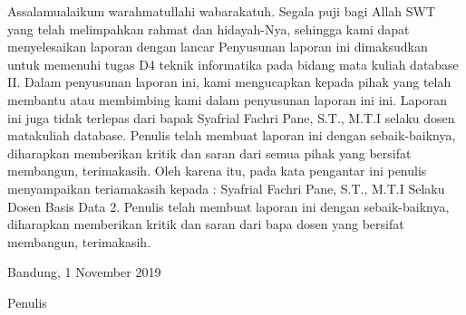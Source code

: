 \begin{acknowledgements}
Assalamualaikum warahmatullahi wabarakatuh. Segala puji bagi Allah SWT yang telah melimpahkan rahmat dan hidayah-Nya, sehingga kami dapat menyelesaikan laporan dengan lancar
Penyusunan laporan ini dimaksudkan untuk memenuhi tugas D4 teknik informatika pada bidang mata kuliah database II. Dalam penyusunan laporan ini, kami mengucapkan kepada pihak yang telah membantu atau membimbing kami dalam penyusunan laporan ini ini. Laporan ini juga tidak terlepas dari bapak Syafrial Fachri Pane, S.T., M.T.I selaku dosen matakuliah database. Penulis telah membuat laporan ini dengan sebaik-baiknya, diharapkan memberikan kritik dan saran dari semua pihak yang bersifat membangun, terimakasih.
Oleh karena itu, pada kata pengantar ini penulis menyampaikan teriamakasih kepada : Syafrial Fachri Pane, S.T., M.T.I Selaku Dosen Basis Data 2.
Penulis telah membuat laporan ini dengan sebaik-baiknya, diharapkan memberikan kritik dan saran dari bapa dosen yang bersifat membangun, terimakasih.

\begin{raggedleft}
\vspace{9ex}
Bandung, 1 November 2019

Penulis

\end{raggedleft}

\end{acknowledgements}